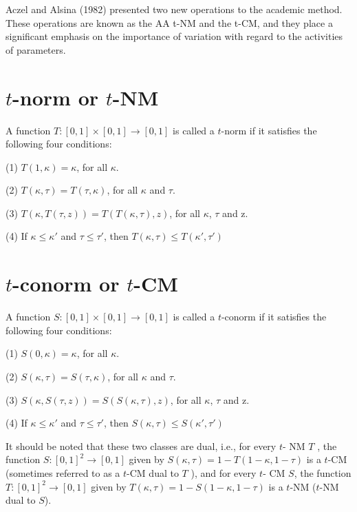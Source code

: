 \begin{flushleft}
\newpage

Aczel and Alsina (1982) presented two new operations to the academic
method. These operations are known as the AA t-NM and the
t-CM, and they place a significant emphasis on the importance of
variation with regard to the activities of parameters.

\vspace{3mm}

\section{$t$-norm or $t$-NM}
A function $T: [0,1] \times [0,1] \rightarrow [0,1]$ is called a
$t$-norm if it satisfies the following four conditions\cite{11}:
\item{(1)} $T(1,\kappa)=\kappa$, for all $\kappa$.
\item{(2)} $T(\kappa,\tau) = T(\tau,\kappa)$, for all $\kappa$ and $\tau$.
\item{(3)} $T(\kappa,T(\tau,z)) = T(T(\kappa,\tau),z)$, for all $\kappa$, $\tau$ and z.
\item{(4)} If $\kappa \leq \kappa'$ and $\tau \leq \tau'$, then $T(\kappa,\tau) \leq T(\kappa',\tau')$

\vspace{3mm}

\section{$t$-conorm or $t$-CM}
A function $S: [0,1] \times [0,1] \rightarrow [0,1]$ is called a
$t$-conorm if it satisfies the following four conditions\cite{11}:
\item{(1)} $S(0,\kappa)=\kappa$, for all $\kappa$.
\item{(2)} $S(\kappa,\tau) = S(\tau,\kappa)$, for all $\kappa$ and $\tau$.
\item{(3)} $S(\kappa,S(\tau,z)) = S(S(\kappa,\tau),z)$, for all $\kappa$, $\tau$ and z.
\item{(4)} If  $\kappa \leq \kappa'$ and $\tau \leq \tau'$, then $S(\kappa,\tau) \leq S(\kappa',\tau')$

\vspace{3mm}

It should be noted that these two classes are dual, i.e., for every $t$-
NM $T$ , the function $S:[0, 1]^2 \rightarrow [0, 1]$ given by $S(\kappa,\tau)=1-T(1-\kappa, 1-\tau)$
is a $t$-CM (sometimes referred to as a $t$-CM dual to $T$ ), and for every $t$-
CM $S$, the function $T : [0, 1]^2 \rightarrow [0, 1]$ given by $T(\kappa,\tau)=1-S(1-\kappa, 1-\tau)$
is a $t$-NM ($t$-NM dual to $S$).


\end{flushleft}
